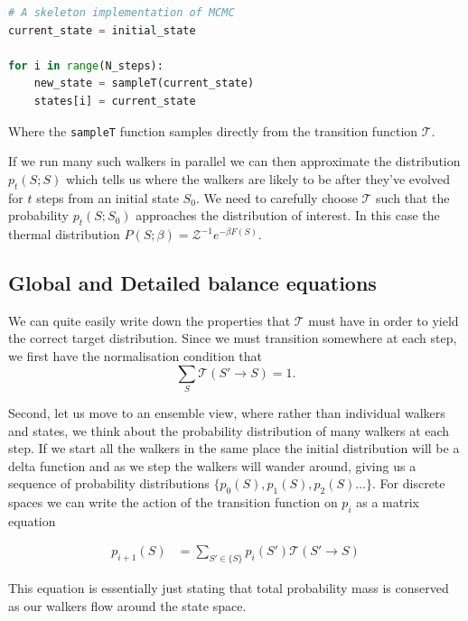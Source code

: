 \begin{lstlisting}[language=Python]
# A skeleton implementation of MCMC
current_state = initial_state

for i in range(N_steps):
    new_state = sampleT(current_state) 
    states[i] = current_state
\end{lstlisting}

Where the \passthrough{\lstinline!sampleT!} function samples directly from the transition function \(\mathcal{T}\).

If we run many such walkers in parallel we can then approximate the distribution \(p_t(S; S)\) which tells us where the walkers are likely to be after they've evolved for \(t\) steps from an initial state \(S_0\). We need to carefully choose \(\mathcal{T}\) such that the probability \(p_t(S; S_0)\) approaches the distribution of interest. In this case the thermal distribution \(P(S; \beta) = \mathcal{Z}^{-1} e^{-\beta F(S)}\).

\hypertarget{global-and-detailed-balance-equations}{%
\subsection{Global and Detailed balance equations}\label{global-and-detailed-balance-equations}}

We can quite easily write down the properties that \(\mathcal{T}\) must have in order to yield the correct target distribution. Since we must transition somewhere at each step, we first have the normalisation condition that \[\sum\limits_S \mathcal{T}(S' \rightarrow S) = 1.\]

Second, let us move to an ensemble view, where rather than individual walkers and states, we think about the probability distribution of many walkers at each step. If we start all the walkers in the same place the initial distribution will be a delta function and as we step the walkers will wander around, giving us a sequence of probability distributions \(\{p_0(S), p_1(S), p_2(S)\ldots\}\). For discrete spaces we can write the action of the transition function on \(p_i\) as a matrix equation

\[\begin{aligned}
p_{i+1}(S) &= \sum_{S' \in \{S\}} p_i(S') \mathcal{T}(S' \rightarrow S)
\end{aligned}\]

This equation is essentially just stating that total probability mass is conserved as our walkers flow around the state space.

